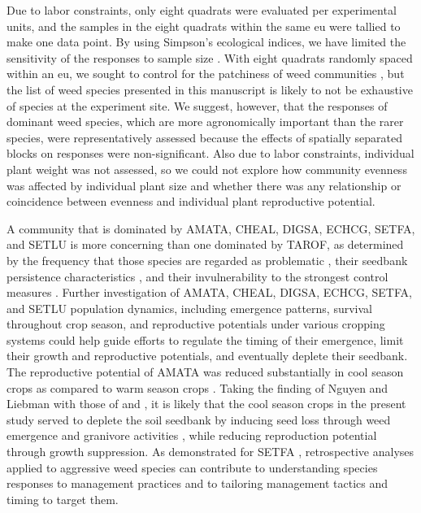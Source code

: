 \documentclass[
]{article}
\begin{document}
Due to labor constraints, only eight quadrats were evaluated per experimental units, and the samples in the eight quadrats within the same eu were tallied to make one data point. By using Simpson's ecological indices, we have limited the sensitivity of the responses to sample size \citep{nkoaWeedAbundanceDistribution2015}. With eight quadrats randomly spaced within an eu, we sought to control for the patchiness of weed communities \citep{cardinaNatureConsequenceWeed1997}, but the list of weed species presented in this manuscript is likely to not be exhaustive of species at the experiment site. We suggest, however, that the responses of dominant weed species, which are more agronomically important than the rarer species, were representatively assessed because the effects of spatially separated blocks on responses were non-significant. Also due to labor constraints, individual plant weight was not assessed, so we could not explore how community evenness was affected by individual plant size and whether there was any relationship or coincidence between evenness and individual plant reproductive potential.

A community that is dominated by AMATA, CHEAL, DIGSA, ECHCG, SETFA, and SETLU is more concerning than one dominated by TAROF, as determined by the frequency that those species are regarded as problematic \citep{krugerGrowerViewsProblematic2009, princeBenchmarkStudyIntroduction2012}, their seedbank persistence characteristics \citep{buhlerEmergencePersistenceSeed2001, davisEnvironmentalFactorsAffecting2005}, and their invulnerability to the strongest control measures \citep{mohlerWeedEvolutionCommunity2001, culpepperGlyphosateinducedWeedShifts2006}. Further investigation of AMATA, CHEAL, DIGSA, ECHCG, SETFA, and SETLU population dynamics, including emergence patterns, survival throughout crop season, and reproductive potentials under various cropping systems could help guide efforts to regulate the timing of their emergence, limit their growth and reproductive potentials, and eventually deplete their seedbank. The reproductive potential of AMATA was reduced substantially in cool season crops as compared to warm season crops \citet{nguyenImpactCroppingSysteminreview}. Taking the finding of Nguyen and Liebman with those of \citet{gabaAgroecologicalWeedControl2014} and \citet{weisbergerDoesDiversifyingCrop2019}, it is likely that the cool season crops in the present study served to deplete the soil seedbank by inducing seed loss through weed emergence and granivore activities \citep{vanderlaatPostdispersalWeedSeed2015}, while reducing reproduction potential through growth suppression. As demonstrated for SETFA \citep{davisCroppingSystemEffects2003a}, retrospective analyses applied to aggressive weed species can contribute to understanding species responses to management practices and to tailoring management tactics and timing to target them.
\end{document}

